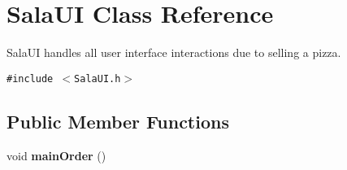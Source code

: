 \hypertarget{class_sala_u_i}{
\section{Sala\-UI Class Reference}
\label{class_sala_u_i}
}
Sala\-UI handles all user interface interactions due to selling a pizza.  


{\tt \#include $<$Sala\-UI.h$>$}

\subsection*{Public Member Functions}
\begin{CompactItemize}
\item 
\hypertarget{class_sala_u_i_d30e21f7319d652c2a2fd88dc274cfbc}{
void {\bf main\-Order} ()}
\label{class_sala_u_i_d30e21f7319d652c2a2fd88dc274cfbc}

\end{CompactItemize}

